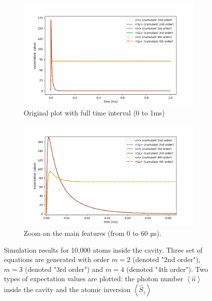 \documentclass[11pt]{report}
\begin{document}
\begin{figure}[h!]
\centering
\begin{subfigure}{.48\textwidth}
  \centering
  \includegraphics[width=1\linewidth]{10k_234_nsz}
  \caption{Original plot with full time interval (0 to 1ms)}
\end{subfigure}%
\hspace{1em}%
\begin{subfigure}{.48\textwidth}
  \centering
  \includegraphics[width=1\linewidth]{10k_234_nsz_zoom_1}
  \caption{Zoom on the main features (from 0 to 60 µs).}
  \label{10k_234_nsz_zoom_1}
\end{subfigure}
\caption{Simulation results for 10,000 atoms inside the cavity. Three set of equations are generated with order $m=2$ (denoted "2nd order"), $m=3$ (denoted "3rd order") and $m=4$ (denoted "4th order"). Two types of expectation values are plotted: the photon number $\left\langle \hat{n} \right\rangle$ inside the cavity and the atomic inversion $\left\langle  \hat{S}_z \right\rangle$}
\end{figure}
\end{document}
